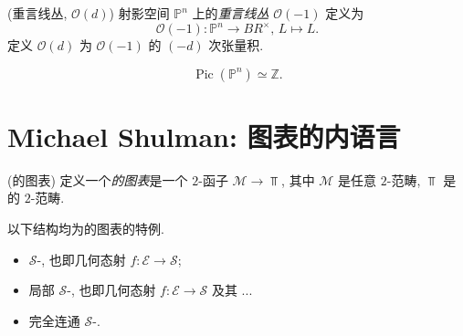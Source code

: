 \documentclass{article}
\begin{document}
	\begin{example}
		{(重言线丛, $\mathcal O(d)$)}
		射影空间 $\mathbb P^n$ 上的\emph{重言线丛} $\mathcal O(-1)$ 定义为
		$$
		\mathcal O(-1) \colon \mathbb P^n \to BR^\times,\, L\mapsto L.
		$$
		定义 $\mathcal O(d)$ 为 $\mathcal O(-1)$ 的 $(-d)$ 次张量积.
	\end{example}
	
	\begin{prop}
		{}
		$$
		\operatorname{Pic}(\mathbb P^n) \simeq\mathbb Z.
		$$
	\end{prop}
	
	\section{Michael Shulman: \topos{}图表的内语言}
	
	\begin{definition}
		{(\topos{}的图表)}
		定义一个\emph{\topos{}的图表}是一个 $2$-函子 $\mathcal M \to \Top$, 其中 $\mathcal M$ 是任意 $2$-范畴, $\Top$ 是\topos{}的 $2$-范畴.
	\end{definition}
	
	\begin{example}
		{}
		以下结构均为\topos{}的图表的特例.
		\begin{itemize}
			\item $\mathcal S$-\topos{}, 也即几何态射 $f\colon \mathcal E \to \mathcal S$;
			\item 局部 $\mathcal S$-\topos{}, 也即几何态射 $f\colon \mathcal E \to \mathcal S$ 及其 ...%
			\item 完全连通 $\mathcal S$-\topos{}.
		\end{itemize}
	\end{example}
\end{document}
